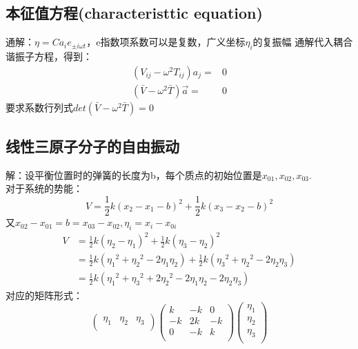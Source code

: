 \documentclass[UTF8,10pt]{article}
\begin{document}
\subsection{本征值方程(characteristtic equation)}
通解：$\eta =Ca_ie_{\pm i\omega t}$，e指数项系数可以是复数，广义坐标$\eta_i$的复振幅
通解代入耦合谐振子方程，得到：
\begin{align*}
    (V_{ij}-\omega^2T_{ij})a_j=         & 0 \\
    (\bar{V}-\omega ^2 \bar{T})\vec{a}= & 0
\end{align*}
要求系数行列式$det(\bar{V}-\omega^2\bar{T})=0$
\subsection{线性三原子分子的自由振动}
解：设平衡位置时的弹簧的长度为b，每个质点的初始位置是$x_{01},x_{02},x_{03}$.
\\对于系统的势能：$$V=\frac{1}{2}k(x_2-x_1-b)^2+\frac{1}{2}k(x_3-x_2-b)^2$$
又$x_{02}-x_{01}=b=x_{03}-x_{02},\eta_i=x_i-x_{0i}$
\begin{align*}
    V & =\frac{1}{2}k(\eta_2-\eta_1)^2+\frac{1}{2}k(\eta_3-\eta_2)^2                                                                            \\
      & =\frac{1}{2}k\left( {\eta _1}^2+{\eta _2}^2-2\eta _1\eta _2 \right) +\frac{1}{2}k\left( {\eta _3}^2+{\eta _2}^2-2\eta _2\eta _3 \right) \\
      & =\frac{1}{2}k\left( {\eta _1}^2+{\eta _3}^2+2{\eta _2}^2-2\eta _1\eta _2-2\eta _2\eta _3 \right)
\end{align*}
对应的矩阵形式：
$$
    \left( \begin{matrix}
            \eta _1 & \eta _2 & \eta _3 \\
        \end{matrix} \right) \left( \begin{matrix}
            k  & -k & 0  \\
            -k & 2k & -k \\
            0  & -k & k  \\
        \end{matrix} \right) \left( \begin{array}{c}
            \eta _1 \\
            \eta _2 \\
            \eta _3 \\
        \end{array} \right)
$$
\end{document}

